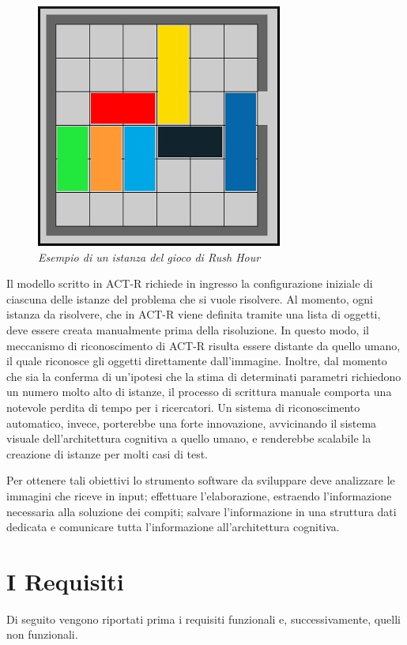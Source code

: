 		\begin{figure}[!h]
		  \begin{center} 
			 \includegraphics[scale=0.6]{images/ch_03/originale.jpg}	
		  \end{center} 
		  \caption{\textit{Esempio di un istanza del gioco di Rush Hour}}
		  \label{fig:RushHourHumanIta}	
	  	\end{figure}

		Il modello scritto in \mbox{ACT-R} richiede in ingresso la configurazione iniziale di ciascuna delle istanze del problema che si vuole risolvere.
		Al momento, ogni istanza da risolvere, che in \mbox{ACT-R} viene definita tramite una lista di oggetti, deve essere creata manualmente prima della risoluzione. 
		In questo modo, il meccanismo di riconoscimento di \mbox{ACT-R} risulta essere distante da quello umano, il quale riconosce gli oggetti direttamente dall'immagine. 
		Inoltre, dal momento che sia la conferma di un'ipotesi che la stima di determinati parametri richiedono un numero molto alto di istanze, il processo di scrittura manuale comporta una notevole perdita di tempo per i ricercatori.
		Un sistema di riconoscimento automatico, invece, porterebbe una forte innovazione, avvicinando il sistema visuale dell'architettura cognitiva a quello umano, e renderebbe scalabile la creazione di istanze per molti casi di test.
		
		Per ottenere tali obiettivi lo strumento software da sviluppare deve analizzare le immagini che riceve in input; effettuare l'elaborazione, estraendo l'informazione necessaria alla soluzione dei compiti; salvare l'informazione in una struttura dati dedicata e comunicare tutta l'informazione all'architettura cognitiva.
		

	\section*{I Requisiti}
		Di seguito vengono riportati prima i requisiti funzionali e, successivamente, quelli non funzionali.
			
